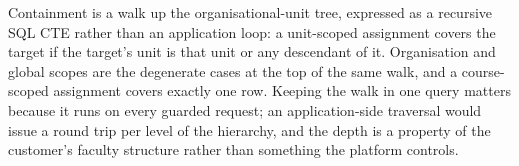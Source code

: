 Containment is a walk up the organisational-unit tree, expressed as a recursive SQL CTE rather than an application loop: a unit-scoped assignment covers the target if the target's unit is that unit or any descendant of it. Organisation and global scopes are the degenerate cases at the top of the same walk, and a course-scoped assignment covers exactly one row. Keeping the walk in one query matters because it runs on every guarded request; an application-side traversal would issue a round trip per level of the hierarchy, and the depth is a property of the customer's faculty structure rather than something the platform controls.
